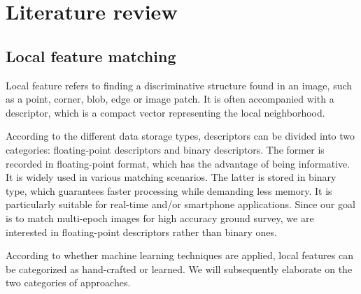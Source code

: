 
\chapter{Literature review}
\label{chap:review}
\minitoc

\section{Local feature matching}
Local feature refers to finding a discriminative structure found in an image, such as a point, corner, blob, edge or image patch. It is often accompanied with a descriptor, which is a compact vector representing the local neighborhood.
\par
According to the different data storage types, descriptors can be divided into two categories: floating-point descriptors and binary descriptors. The former is recorded in floating-point format, which has the advantage of being informative. It is widely used in various matching scenarios.
The latter is stored in binary type, which guarantees faster processing while demanding less memory. It is particularly suitable for real-time and/or smartphone applications.
Since our goal is to match multi-epoch images for high accuracy ground survey, we are interested in floating-point descriptors rather than binary ones.
\par
According to whether machine learning techniques are applied, local features can be categorized as hand-crafted or learned. We will subsequently elaborate on the two categories of approaches.
